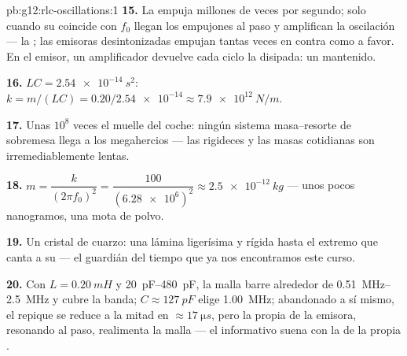 \begin{solution}{pb:g12:rlc-oscillations:1}
\textbf{15.} La  empuja millones de veces por segundo; solo cuando
su  coincide con $f_0$ llegan los empujones al paso y
amplifican la oscilación --- la ; las emisoras desintonizadas
empujan tantas veces en contra como a favor. En el emisor, un
amplificador devuelve cada ciclo la  disipada: un 
mantenido.

\textbf{16.} $LC = \qty{2.54e-14}{s^2}$: $k = m/(LC) =
0.20/\num{2.54e-14} \approx \qty{7.9e12}{N/m}$.

\textbf{17.} Unas $10^8$ veces el muelle del coche: ningún sistema
masa--resorte de sobremesa llega a los megahercios --- las rigideces y
las masas cotidianas son irremediablemente lentas.

\textbf{18.} $m = \dfrac{k}{(2\pi f_0)^2} = \dfrac{100}
{(\num{6.28e6})^2} \approx \qty{2.5e-12}{kg}$ --- unos pocos
nanogramos, una mota de polvo.

\textbf{19.} Un cristal de cuarzo: una lámina ligerísima y rígida hasta
el extremo que canta a su  --- el guardián del tiempo
que ya nos encontramos este curso.

\textbf{20.} Con $L = \qty{0.20}{mH}$ y \qtyrange{20}{480}{pF}, la malla
barre alrededor de \qtyrange{0.51}{2.5}{MHz} y cubre la banda;
$C \approx \qty{127}{pF}$ elige \qty{1.00}{MHz}; abandonado a sí mismo,
el repique se reduce a la mitad en $\approx \qty{17}{\micro s}$, pero la
propia  de la emisora, resonando al paso, realimenta la malla --- el
informativo suena con la  de la propia .
\end{solution}
